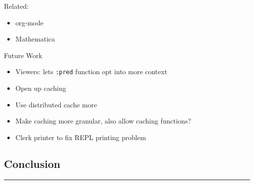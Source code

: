 \documentclass[
]{article}
\newcommand{\passthrough}[1]{#1}
\providecommand{\tightlist}{%
  \setlength{\itemsep}{0pt}\setlength{\parskip}{0pt}}
\begin{document}
Related:

\begin{itemize}
\tightlist
\item
  org-mode
\item
  Mathematica
\end{itemize}

Future Work

\begin{itemize}
\tightlist
\item
  Viewers: lets \passthrough{\lstinline!:pred!} function opt into more context
\item
  Open up caching
\item
  Use distributed cache more
\item
  Make caching more granular, also allow caching functions?
\item
  Clerk printer to fix REPL printing problem
\end{itemize}

\hypertarget{id}{%
\subsection{Conclusion}\label{id}}

\begin{center}\rule{0.5\linewidth}{0.5pt}\end{center}
\end{document}
